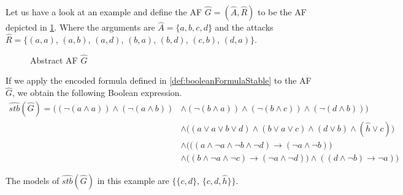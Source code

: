 \begin{example}
    Let us have a look at an example and define the AF $\hat{G}=(\hat{A}, \hat{R})$ to be the AF depicted in \cref{af:algorithmEncodingsStable}. Where the arguments are $\hat{A}=\{a, b, c, d\}$ and the attacks $\hat{R}=\big\{ (a,a)$, $(a,b)$, $(a,d)$, $(b,a)$, $(b,d)$, $(c,b)$, $(d,a)\big\}$.

    \begin{figure}[H]
        \centering
        \caption{Abstract AF $\hat{G}$}
        \label{af:algorithmEncodingsStable}
    \end{figure}

If we apply the encoded formula defined in \cref{def:booleanFormulaStable} to the AF $\hat{G}$, we obtain the following Boolean expression.
\begin{align*}
    \hat{stb}(\hat{G}) = \bigl( (\lnot (a \land a)) \land (\lnot (a \land b)) 
    & \land (\lnot (b \land a)) \land (\lnot (b \land c)) \land (\lnot (d \land b)) \bigl) \\
    &\land \bigl( (a \lor a \lor b \lor d) \land (b \lor a \lor c) \land (d \lor b) \land (\hat{h} \lor c)\bigl) \\
    &\land \bigl( ((a \land \lnot a \land \lnot b \land \lnot d) \rightarrow (\lnot a \land \lnot b)\bigl)\\
    &\land \bigl((b \land \lnot a \land \lnot c) \rightarrow (\lnot a \land \lnot d)) \land ((d \land \lnot b) \rightarrow \lnot a)\bigl)
\end{align*}


The models of $\hat{stb}(\hat{G})$ in this example are $\bigl\{$$\{c, d\}$, $\{c, d, \hat{h}\} \bigl\}$.
\end{example}

